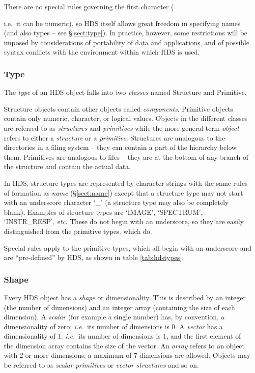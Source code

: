 \documentclass[final,authoryear,5p,times,twocolumn]{elsarticle}
\begin{document}
There are no special rules governing the first character
({i.e.\ it can be numeric), so HDS itself allows great freedom in specifying
names (and also types -- see \S\ref{sect:type}). In practice,
however, some restrictions will be imposed by considerations of
portability of data and applications, and of possible syntax conflicts
with the environment within which HDS is used.

\subsubsection{\label{sect:type}Type}

The \emph{type} of an HDS object falls into two \emph{classes} named
Structure and Primitive.

Structure objects contain other objects called
\emph{components}. Primitive objects contain only numeric, character,
or logical values. Objects in the different classes are referred to as
\emph{structures} and \emph{primitives} while the more general term
\emph{object} refers to either a \emph{structure} or a
\emph{primitive}. Structures are analogous to the directories in a
filing system -- they can contain a part of the hierarchy below
them. Primitives are analogous to files -- they are at the bottom of
any branch of the structure and contain the actual data.

In HDS, structure types are represented by character strings with the
same rules of formation as \emph{name} (\S\ref{sect:name}) except that
a structure type may not start with an underscore character `\_' (a
structure type may also be completely blank). Examples of structure
types are `IMAGE', `SPECTRUM', `INSTR\_RESP', \emph{etc.} These do not
begin with an underscore, so they are easily distinguished from the
primitive types, which do.

Special rules apply to the primitive types, which all begin with an
underscore and are ``pre-defined'' by HDS, as shown in table
\ref{tab:hdstypes}.

\subsubsection{\label{sect:shape}Shape}

Every HDS object has a \emph{shape} or dimensionality. This is
described by an integer (the number of dimensions) and an integer
array (containing the size of each dimension). A \emph{scalar} (for
example a single number) has, by convention, a dimensionality of zero;
\emph{i.e.}\ its number of dimensions is 0. A \emph{vector} has a
dimensionality of 1; \emph{i.e.}\ its number of dimensions is 1, and
the first element of the dimension array contains the size of the
vector.  An \emph{array} refers to an object with 2 or more dimensions;
a maximum of 7 dimensions are allowed. Objects may be referred to as
\emph{scalar primitives} or \emph{vector structures} and so on.

}
\end{document}
